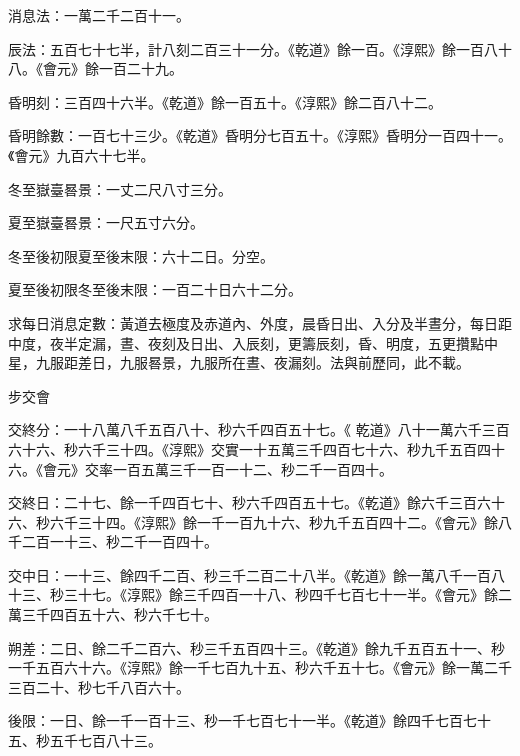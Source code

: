 \begin{pinyinscope}
 消息法：一萬二千二百十一。



 辰法：五百七十七半，計八刻二百三十一分。《乾道》餘一百。《淳熙》餘一百八十八。《會元》餘一百二十九。



 昏明刻：三百四十六半。《乾道》餘一百五十。《淳熙》餘二百八十二。



 昏明餘數：一百七十三少。《乾道》昏明分七百五十。《淳熙》昏明分一百四十一。《會元》九百六十七半。



 冬至嶽臺晷景：一丈二尺八寸三分。



 夏至嶽臺晷景：一尺五寸六分。



 冬至後初限夏至後末限：六十二日。分空。



 夏至後初限冬至後末限：一百二十日六十二分。



 求每日消息定數：黃道去極度及赤道內、外度，晨昏日出、入分及半晝分，每日距中度，夜半定漏，晝、夜刻及日出、入辰刻，更籌辰刻，昏、明度，五更攢點中星，九服距差日，九服晷景，九服所在晝、夜漏刻。法與前歷同，此不載。



 步交會



 交終分：一十八萬八千五百八十、秒六千四百五十七。《
 乾道》八十一萬六千三百六十六、秒六千三十四。《淳熙》交實一十五萬三千四百七十六、秒九千五百四十六。《會元》交率一百五萬三千一百一十二、秒二千一百四十。



 交終日：二十七、餘一千四百七十、秒六千四百五十七。《乾道》餘六千三百六十六、秒六千三十四。《淳熙》餘一千一百九十六、秒九千五百四十二。《會元》餘八千二百一十三、秒二千一百四十。



 交中日：一十三、餘四千二百、秒三千二百二十八半。《乾道》餘一萬八千一百八十三、秒三十七。《淳熙》餘三千四百一十八、秒四千七百七十一半。《會元》餘二萬三千四百五十六、秒六千七十。



 朔差：二日、餘二千二百六、秒三千五百四十三。《乾道》餘九千五百五十一、秒一千五百六十六。《淳熙》餘一千七百九十五、秒六千五十七。《會元》餘一萬二千三百二十、秒七千八百六十。



 後限：一日、餘一千一百十三、秒一千七百七十一半。《乾道》餘四千七百七十五、秒五千七百八十三。




\end{pinyinscope}
